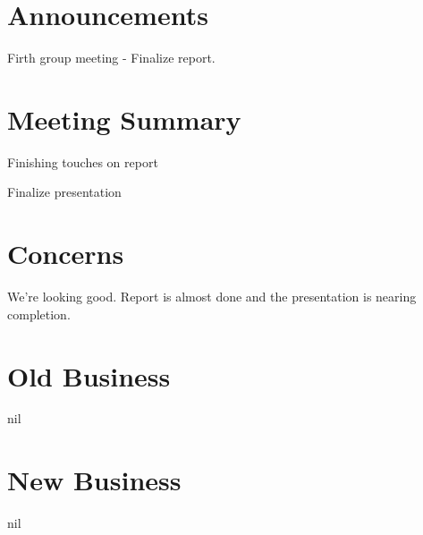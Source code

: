 \documentclass[11pt]{meetingmins}
\begin{document}
\maketitle

\section{Announcements}
\begin{hiddenitems}
\item Firth group meeting - Finalize report.

\end{hiddenitems}

\section{Meeting Summary}
\begin{items}

\item
Finishing touches on report

\item
Finalize presentation

\end{items}


\section{Concerns}
\begin{items}
\item We're looking good. Report is almost done and the presentation is nearing completion.
\end{items}

\section{Old Business}
\begin{items}

\item nil

\end{items}

\section{New Business}
\begin{items}
\item nil
\end{items}

\vspace{1em}
\end{document}
